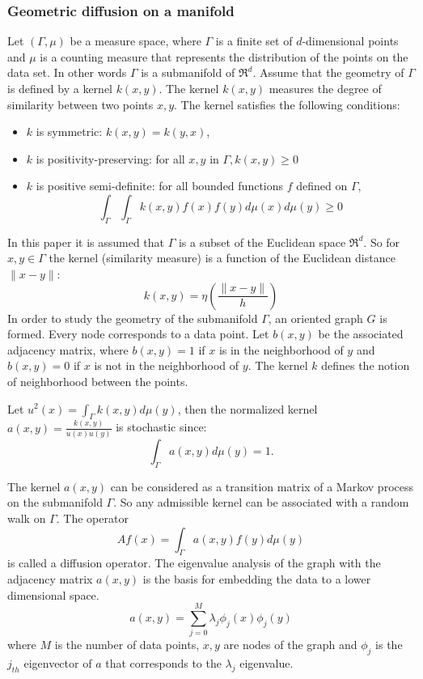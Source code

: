 \documentclass[12pt,letterpaper,doublespaced,ETD,dvips,proposal]{gtthesis}
\begin{document}
\begin{Body}
\subsubsection{Geometric diffusion on a manifold}
Let  $(\Gamma,\mu)$
be a measure space, where $\Gamma$ is a finite set of
$d$-dimensional points and $\mu$ is a counting measure that
represents the distribution of the points on the  data set. In other
words $\Gamma$ is a submanifold of $\Re^{d}$. Assume that the
geometry of $\Gamma$ is defined by a kernel $k(x,y)$. The kernel
$k(x,y)$ measures the degree of similarity between two points $x,y$.
The kernel satisfies the following conditions:
\begin{itemize}
    \item   $k$ is symmetric: $k(x,y)=k(y,x)$,
    \item   $k$ is positivity-preserving: for all $x,y$ in
$\Gamma, k(x,y)\geq 0$
    \item   $k$ is positive semi-definite: for all bounded
functions $f$ defined on  $\Gamma$,
\[
\int_{\Gamma} \int_{\Gamma} k(x,y)f(x)f(y)d\mu(x)d\mu(y)\geq 0\]
\end{itemize}
In this paper it is assumed that $\Gamma$ is a subset of the
Euclidean space $\Re^{d}$. So for $x,y\in\Gamma$ the kernel
(similarity measure) is a function of the Euclidean distance
$\parallel x-y\parallel:$
\[
 k(x,y)=\eta\left(\frac{\parallel x-y\parallel}{h}\right)
\]
In order to study the geometry of the submanifold $\Gamma$, an
oriented graph $G$ is formed. Every node corresponds to a data
point. Let $b(x,y)$ be the associated adjacency matrix, where
$b(x,y)=1$ if $x$ is in the neighborhood of $y$ and $b(x,y)=0$ if
$x$ is not in the neighborhood of $y$. The kernel $k$ defines the
notion of neighborhood between the points.

Let $u^2(x)=\int_{\Gamma}k(x,y)d\mu(y)$, then the normalized kernel
$a(x,y)=\frac{k(x,y)}{u(x)u(y)}$ is stochastic since:
\begin{equation}\label{kernel}
    \int_{\Gamma}a(x,y)d\mu(y)=1.
\end{equation}

The kernel $a(x,y)$ can be considered as a transition matrix of a
Markov process on the submanifold $\Gamma$. So any admissible kernel
can be associated with a random walk on $\Gamma$. The operator
\[
    Af(x)=\int_{\Gamma}a(x,y)f(y)d\mu(y)
\]
is called a diffusion operator. The eigenvalue analysis of the graph
with the adjacency matrix $a(x,y)$ is the basis for embedding the
data to a lower dimensional space.
\[
    a(x,y)=\sum_{j=0}^{M} \lambda_{j}\phi_{j}(x)\phi_{j}(y)
\]
where $M$ is the number of data points, $x,y$ are nodes of the graph
and $\phi_j$ is the $j_{th}$ eigenvector of $a$ that corresponds to
the $\lambda_j$ eigenvalue.



\end{Body}
\end{document}
